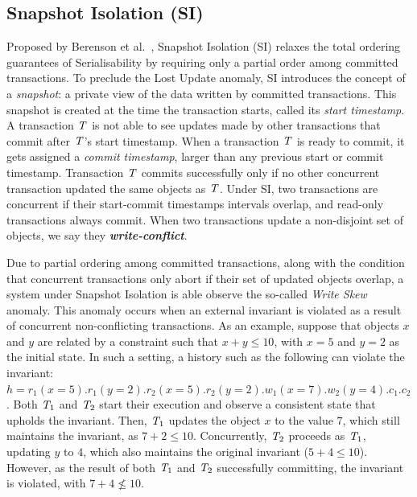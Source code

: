 \subsection{Snapshot Isolation (SI)}
\label{sect:si}

Proposed by Berenson et al.~\citep{sql-critique}, Snapshot Isolation (SI) relaxes the total ordering guarantees of Serialisability by requiring only a partial order among committed transactions. To preclude the Lost Update anomaly, SI introduces the concept of a \emph{snapshot}: a private view of the data written by committed transactions. This snapshot is created at the time the transaction starts, called its \emph{start timestamp}. A transaction $\mathit{T}$ is not able to see updates made by other transactions that commit after $\mathit{T}$'s start timestamp. When a transaction $\mathit{T}$ is ready to commit, it gets assigned a \emph{commit timestamp}, larger than any previous start or commit timestamp. Transaction $\mathit{T}$ commits successfully only if no other concurrent transaction updated the same objects as $\mathit{T}$. Under SI, two transactions are concurrent if their start-commit timestamps intervals overlap, and read-only transactions always commit. When two transactions update a non-disjoint set of objects, we say they \textbf{\em write-conflict}.

Due to partial ordering among committed transactions, along with the condition that concurrent transactions only abort if their set of updated objects overlap, a system under Snapshot Isolation is able observe the so-called \emph{Write Skew} anomaly. This anomaly occurs when an external invariant is violated as a result of concurrent non-conflicting transactions. As an example, suppose that objects $x$ and $y$ are related by a constraint such that $x + y \le 10$, with $x = 5$ and $y = 2$ as the initial state. In such a setting, a history such as the following can violate the invariant: $h = r_1(x=5).r_1(y=2).r_2(x=5).r_2(y=2).w_1(x=7).w_2(y=4).c_1.c_2$. Both $\mathit{T}_1$ and $\mathit{T}_2$ start their execution and observe a consistent state that upholds the invariant. Then, $\mathit{T}_1$ updates the object $x$ to the value $7$, which still maintains the invariant, as $7 + 2 \le 10$. Concurrently, $\mathit{T}_2$ proceeds as $\mathit{T}_1$, updating $y$ to $4$, which also maintains the original invariant ($5 + 4 \le 10$). However, as the result of both $\mathit{T}_1$ and $\mathit{T}_2$ successfully committing, the invariant is violated, with $7 + 4 \not\le 10$.


